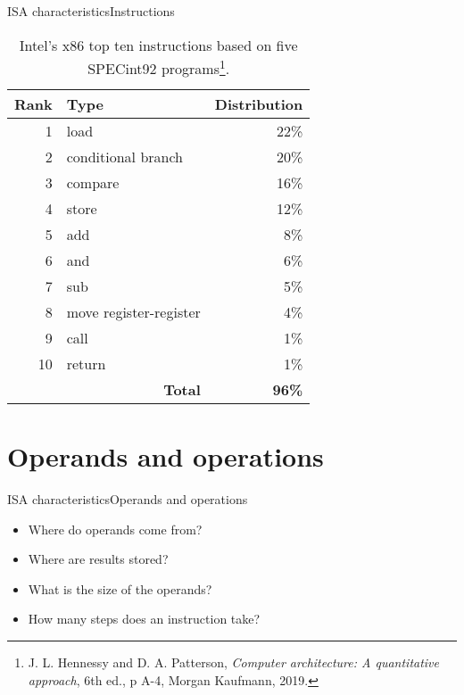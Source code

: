 \begin{frame}{\acs{ISA} characteristics}{Instructions}
\vspace{-17pt}
\begin{table}[htbp]
    \centering
    \caption{Intel's x86 top ten instructions based on five SPECint92 programs\footnote{J. L. Hennessy and D. A. Patterson, \emph{Computer architecture: A quantitative approach}, 6th ed., p A-4, Morgan Kaufmann, 2019.}.}
      \begin{tabular}{r|l|r}
        \hline
  	    \textbf{Rank} & \textbf{Type} & \textbf{Distribution} \\
  	    \hline
  	    \hline
  	    1 & load                        & 22\% \\ \hline
        2 & conditional branch          & 20\% \\ \hline
        3 & compare                     & 16\% \\ \hline
        4 & store                       & 12\% \\ \hline
        5 & add                         & 8\%  \\ \hline
        6 & and                         & 6\%  \\ \hline
        7 & sub                         & 5\%  \\ \hline
        8 & move register-register      & 4\%  \\ \hline
        9 & call                        & 1\%  \\ \hline
       10 & return                      & 1\%  \\ \hline\hline
    \multicolumn{2}{r|}{\textbf{Total}} & \textbf{96\%} \\ \hline
  	  \end{tabular}
  \end{table}
\end{frame}

\section{Operands and operations}
\begin{frame}{\acs{ISA} characteristics}{Operands and operations}
	\begin{itemize}
	\item Where do operands come from?
	\item Where are results stored? 
	\item What is the size of the operands?
	\item How many steps does an instruction take?
  \end{itemize}
\end{frame}

